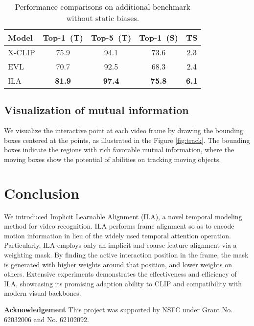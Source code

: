 \documentclass[10pt,twocolumn,letterpaper]{article}
\begin{document}
\begin{table}[htbp]\small
  \caption{Performance comparisons on additional benchmark without static biases.}
  \begin{center}
  \renewcommand\arraystretch{1.2}
  \begin{tabular}{lcccc}
    \toprule
Model  & Top-1~(T)      & Top-5~(T)      & Top-1~(S)      & TS \\ \midrule
X-CLIP & 75.9          & 94.1          & 73.6          & 2.3            \\
EVL    & 70.7          & 92.5          & 68.3          & 2.4            \\
ILA    & \textbf{81.9} & \textbf{97.4} & \textbf{75.8} & \textbf{6.1}           \\ \bottomrule 
  \end{tabular}
  \end{center}
  \label{table:14}
  \vspace{-0.2in}
\end{table}

\subsection{Visualization of mutual information}
\noindent We visualize the interactive point at each video frame by drawing the bounding boxes centered at the points, as illustrated in the Figure \ref{fig:track}. The bounding boxes indicate the regions with rich favorable mutual information, where the moving boxes show the potential of abilities on tracking moving objects.

\section{Conclusion}

We introduced Implicit Learnable Alignment (ILA), a novel temporal modeling method for video recognition. ILA performs frame alignment so as to encode motion information in lieu of the widely used temporal attention operation. Particularly, ILA employs only an implicit and coarse feature alignment via a weighting mask. 
By finding the active interaction position in the frame, the mask is generated with higher weights around that position, and lower weights on others. Extensive experiments demonstrates the effectiveness and efficiency of ILA, showcasing its promising adaption ability to CLIP and compatibility with modern visual backbones.

\noindent\textbf{Acknowledgement} This project was supported by NSFC under Grant No. 62032006  and No. 62102092.
\end{document}
